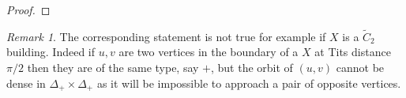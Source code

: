 \documentclass[a4paper, 11pt]{article}
\theoremstyle{plain}
\theoremstyle{definition}
\theoremstyle{remark}
\newtheorem{remark}[proposition]{Remark}
\DeclareMathOperator{\proj}{proj}
\newcommand{\op}{\mathrm{op}}
\begin{document}
\begin{proof}
% 
% 
% 
%
%
%




\end{proof}

\begin{remark}
    The corresponding statement is not true for example if $X$ is a $\tilde C_2$ building. Indeed if $u,v$ are two vertices in the boundary of a $X$ at Tits distance $\pi/2$ then they are of the same type, say $+$, but the orbit of $(u,v)$ cannot be dense in $\Delta_+\times \Delta_+$ as it will be impossible to approach a pair of opposite vertices.    
\end{remark}
\end{document}
